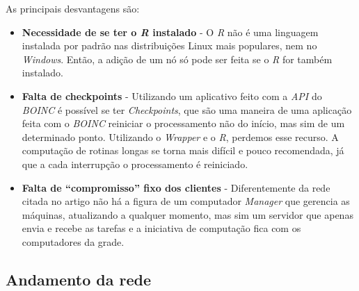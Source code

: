 As principais desvantagens são:

\begin{itemize}
  \item \textbf{Necessidade de se ter o \emph{R} instalado} - O \emph{R} não é uma linguagem instalada por padrão
nas distribuições Linux mais populares, nem no \emph{Windows}. Então, a adição de um nó só pode ser feita se o \emph{R}
for também instalado. 
  \item \textbf{Falta de checkpoints} - Utilizando um aplicativo feito com a \emph{API} do \emph{BOINC} é possível se ter
\emph{Checkpoints}, que são uma maneira de uma aplicação feita com o \emph{BOINC} reiniciar o processamento
não do início, mas sim de um determinado ponto. Utilizando o \emph{Wrapper} e o \emph{R}, perdemos esse recurso. A computação
de rotinas longas se torna mais difícil e pouco recomendada, já que a cada interrupção o processamento é reiniciado. 
  \item \textbf{Falta de ``compromisso'' fixo dos clientes} - Diferentemente da rede citada no artigo %
não há a figura de um computador \emph{Manager} que gerencia as máquinas, atualizando a qualquer momento, mas sim um servidor 
que apenas envia e recebe as tarefas e a iniciativa de computação fica com os computadores da grade. 

\end{itemize}

\subsection{Andamento da rede}


